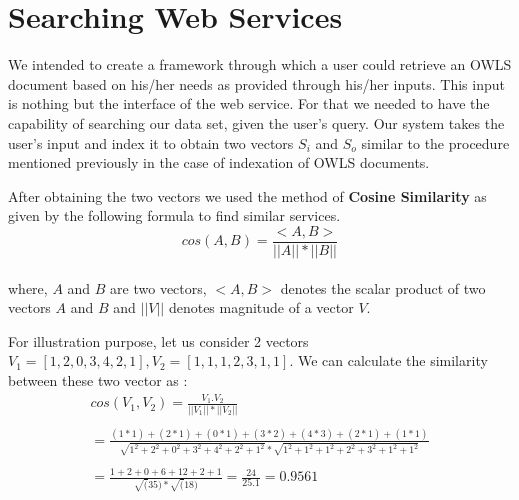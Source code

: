 \documentclass[12pt, twoside]{book}
\begin{document}
\section{Searching Web Services}
We intended to create a framework through which a user could retrieve an OWLS document based on his/her needs as provided through his/her inputs. This input is nothing but the interface of the web service. For that we needed to have the capability of searching our data set, given the user's query. Our system takes the user's input and index it to obtain two vectors $S_{i}$ and $S_{o}$ similar to the procedure mentioned previously in the case of indexation of OWLS documents. \\ \par
After obtaining the two vectors we used the method of \textbf{Cosine Similarity} as given by the following formula to find similar services.
\begin{equation}
  cos (A, B) = \frac{<A, B>}{|| A || * || B ||}
\end{equation}
\\
where, $A$ and $B$ are two vectors, $<A, B>$ denotes the scalar product of two vectors $A$ and $B$ and $||V||$ denotes magnitude of a vector $V$. \\ \par
For illustration purpose, let us consider 2 vectors $V_{1} = \left[ 1, 2, 0, 3, 4, 2, 1\right], V_{2} = \left[ 1, 1, 1, 2, 3, 1, 1\right]$. We can calculate the similarity between these two vector as : \\
\begin{multline}
 cos(V_{1}, V_{2}) = \frac{V_{1} . V_{2}}{||V_{1}||*||V_{2}||}  \\ \\ =  \frac{(1*1)+(2*1)+(0*1)+(3*2)+(4*3)+(2*1)+(1*1)}{\sqrt{1^{2} + 2^{2} + 0^{2} + 3^{2} + 4^{2} + 2^{2} + 1^{2}} * \sqrt{1^{2} + 1^{2} + 1^{2} + 2^{2} + 3^{2} + 1^{2} + 1^{2}}}  \\  \\=  \frac{1 + 2 + 0 + 6 + 12 + 2 + 1}{\sqrt(35)*\sqrt(18)} = \frac{24}{25.1} = 0.9561
\end{multline}
\end{document}
